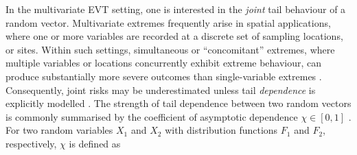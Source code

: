 \documentclass[12pt]{article}
\begin{document}
In the multivariate EVT setting, one is interested in the \emph{joint} tail behaviour of a random vector.
Multivariate extremes frequently arise in spatial applications, where one or more variables are recorded at a discrete set of sampling locations, or sites. 
Within such settings, simultaneous or ``concomitant'' extremes, where multiple variables or locations concurrently exhibit extreme behaviour, can produce substantially more severe outcomes than single-variable extremes \citep{zscheischler2018future, bevacqua2021guidelines, Rohrbeck2021, Sando2022}.
Consequently, joint risks may be underestimated unless tail \emph{dependence} is explicitly modelled \citep{Zhang2024}. 
The strength of tail dependence between two random vectors is commonly summarised by the coefficient of asymptotic dependence \(\chi\in[0,1]\) \citep[see e.g.,][]{Coles1999}.
For two random variables $X_1$ and $X_2$ with distribution functions $F_1$ and $F_2$, respectively, $\chi$ is defined as
\end{document}
